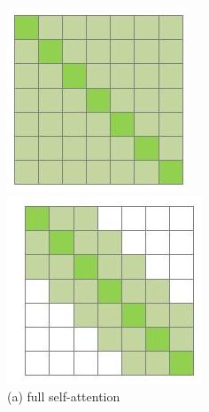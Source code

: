 \begin{figure}[ht]
\begin{minipage}[b]{0.25\textwidth}
\centering
    \includegraphics[width=\textwidth]{images/attention_full.jpg}
    \caption*{(a) full self-attention}
\end{minipage}
\hfill
\begin{minipage}[b]{0.25\textwidth}
\centering
    \includegraphics[width=\textwidth]{images/attention_sidewindow.jpg}

\end{minipage}
\end{figure}

